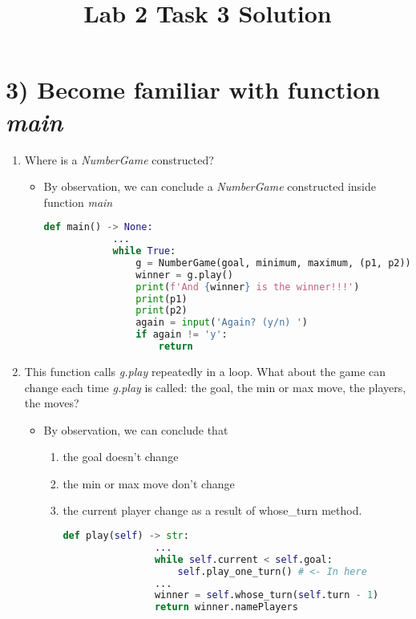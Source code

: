 \documentclass[12pt]{article}
\begin{document}
\title{Lab 2 Task 3 Solution}
\date{}
\maketitle


\section*{3) Become familiar with function \textit{main}}
\begin{enumerate}[1.]
    \item Where is a \textit{NumberGame} constructed?

    \begin{itemize}
        \item
        By observation, we can conclude a \textit{NumberGame} constructed
        inside function \textit{main}

        \begin{lstlisting}[language=Python]
        def main() -> None:
            ...
            while True:
                g = NumberGame(goal, minimum, maximum, (p1, p2)) #<- Here!!
                winner = g.play()
                print(f'And {winner} is the winner!!!')
                print(p1)
                print(p2)
                again = input('Again? (y/n) ')
                if again != 'y':
                    return

        \end{lstlisting}
    \end{itemize}

    \item This function calls \textit{g.play} repeatedly in a loop. What about the
    game can change each time \textit{g.play} is called: the goal, the min or max
    move, the players, the moves?

    \begin{itemize}
        \item

        By observation, we can conclude that

        \begin{enumerate}[1.]
            \item the goal doesn't change
            \item the min or max move don't change
            \item the current player change as a result of whose\_turn method.

            \begin{lstlisting}[language=Python]
            def play(self) -> str:
                ...
                while self.current < self.goal:
                    self.play_one_turn() # <- In here
                ...
                winner = self.whose_turn(self.turn - 1)
                return winner.namePlayers


\end{lstlisting}
\end{enumerate}
\end{itemize}
\end{enumerate}
\end{document}
